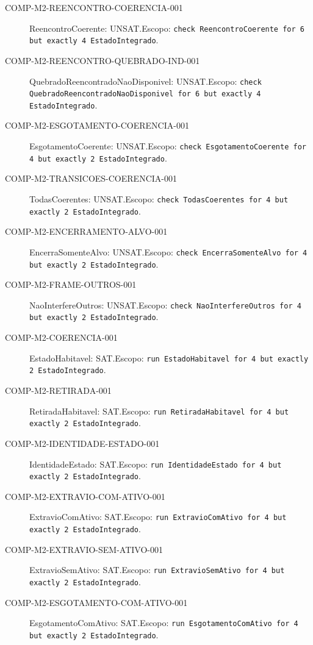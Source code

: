 \begin{description}
\item[COMP-M2-REENCONTRO-COERENCIA-001] ReencontroCoerente: UNSAT.\newline Escopo: \texttt{check ReencontroCoerente for 6 but exactly 4 EstadoIntegrado}.
\item[COMP-M2-REENCONTRO-QUEBRADO-IND-001] QuebradoReencontradoNaoDisponivel: UNSAT.\newline Escopo: \texttt{check QuebradoReencontradoNaoDisponivel for 6 but exactly 4 EstadoIntegrado}.
\item[COMP-M2-ESGOTAMENTO-COERENCIA-001] EsgotamentoCoerente: UNSAT.\newline Escopo: \texttt{check EsgotamentoCoerente for 4 but exactly 2 EstadoIntegrado}.
\item[COMP-M2-TRANSICOES-COERENCIA-001] TodasCoerentes: UNSAT.\newline Escopo: \texttt{check TodasCoerentes for 4 but exactly 2 EstadoIntegrado}.
\item[COMP-M2-ENCERRAMENTO-ALVO-001] EncerraSomenteAlvo: UNSAT.\newline Escopo: \texttt{check EncerraSomenteAlvo for 4 but exactly 2 EstadoIntegrado}.
\item[COMP-M2-FRAME-OUTROS-001] NaoInterfereOutros: UNSAT.\newline Escopo: \texttt{check NaoInterfereOutros for 4 but exactly 2 EstadoIntegrado}.
\item[COMP-M2-COERENCIA-001] EstadoHabitavel: SAT.\newline Escopo: \texttt{run EstadoHabitavel for 4 but exactly 2 EstadoIntegrado}.
\item[COMP-M2-RETIRADA-001] RetiradaHabitavel: SAT.\newline Escopo: \texttt{run RetiradaHabitavel for 4 but exactly 2 EstadoIntegrado}.
\item[COMP-M2-IDENTIDADE-ESTADO-001] IdentidadeEstado: SAT.\newline Escopo: \texttt{run IdentidadeEstado for 4 but exactly 2 EstadoIntegrado}.
\item[COMP-M2-EXTRAVIO-COM-ATIVO-001] ExtravioComAtivo: SAT.\newline Escopo: \texttt{run ExtravioComAtivo for 4 but exactly 2 EstadoIntegrado}.
\item[COMP-M2-EXTRAVIO-SEM-ATIVO-001] ExtravioSemAtivo: SAT.\newline Escopo: \texttt{run ExtravioSemAtivo for 4 but exactly 2 EstadoIntegrado}.
\item[COMP-M2-ESGOTAMENTO-COM-ATIVO-001] EsgotamentoComAtivo: SAT.\newline Escopo: \texttt{run EsgotamentoComAtivo for 4 but exactly 2 EstadoIntegrado}.

\end{description}
